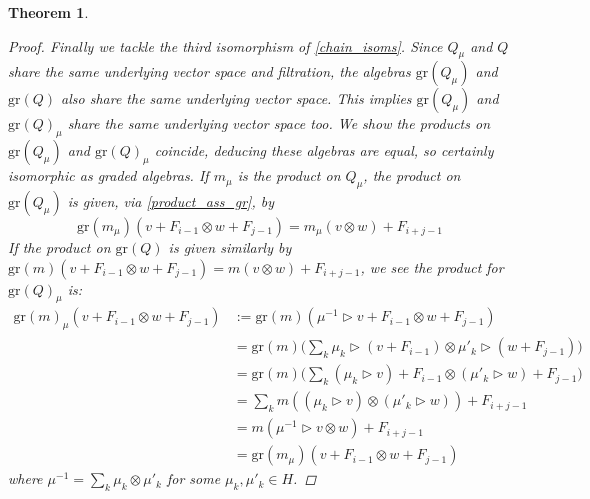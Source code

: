 \documentclass[10pt]{article}
\newcommand{\bb}{\medbreak}
\newcommand{\nt}{\noindent}
\newcommand{\gr}{\text{gr}}
\newtheorem{theorem}[lemma]{Theorem}
\theoremstyle{definition}
\begin{document}
\begin{theorem}
\begin{proof}
\nt Finally we tackle the third isomorphism of \eqref{chain_isoms}. Since $Q_\mu$ and $Q$ share the same underlying vector space and filtration, the algebras $\gr(Q_\mu)$ and $\gr(Q)$ also share the same underlying vector space. This implies $\gr(Q_\mu)$ and $\gr(Q)_\mu$ share the same underlying vector space too. We show the products on $\gr(Q_\mu)$ and $\gr(Q)_\mu$ coincide, deducing these algebras are equal, so certainly isomorphic as graded algebras. If $m_\mu$ is the product on $Q_\mu$, the product on $\gr(Q_\mu)$ is given, via \eqref{product_ass_gr}, by
\begin{equation*}\label{mu_gr_product}
\gr(m_\mu)(v+F_{i-1}\otimes w+F_{j-1})=m_\mu(v\otimes w)+F_{i+j-1}
\end{equation*}
If the product on $\gr(Q)$ is given similarly by $\gr(m)(v+F_{i-1}\otimes w+F_{j-1})=m(v\otimes w)+F_{i+j-1}$, we see the product for $\gr(Q)_\mu$ is:
\begin{align*}
\gr(m)_\mu(v+F_{i-1}\otimes w+F_{j-1}) & :=\gr(m)(\mu^{-1}\rhd v+F_{i-1}\otimes w+F_{j-1})\\
& = \gr(m)\bigg(\sum_k \mu_k\rhd (v+F_{i-1})\otimes \mu'_k\rhd (w+F_{j-1}) \bigg)\\
& = \gr(m)\bigg(\sum_k (\mu_k\rhd v)+F_{i-1}\otimes (\mu'_k\rhd w)+F_{j-1}\bigg)\\
& = \sum_k m((\mu_k\rhd v)\otimes (\mu'_k\rhd w))+F_{i+j-1}\\
& = m(\mu^{-1}\rhd v\otimes w)+F_{i+j-1}\\
& = \gr(m_\mu)(v+F_{i-1}\otimes w+F_{j-1})
\end{align*}
where $\mu^{-1}=\sum_k \mu_k\otimes \mu'_k$ for some $\mu_k,\mu'_k\in H$.


\end{proof}
\end{theorem}
\end{document}
